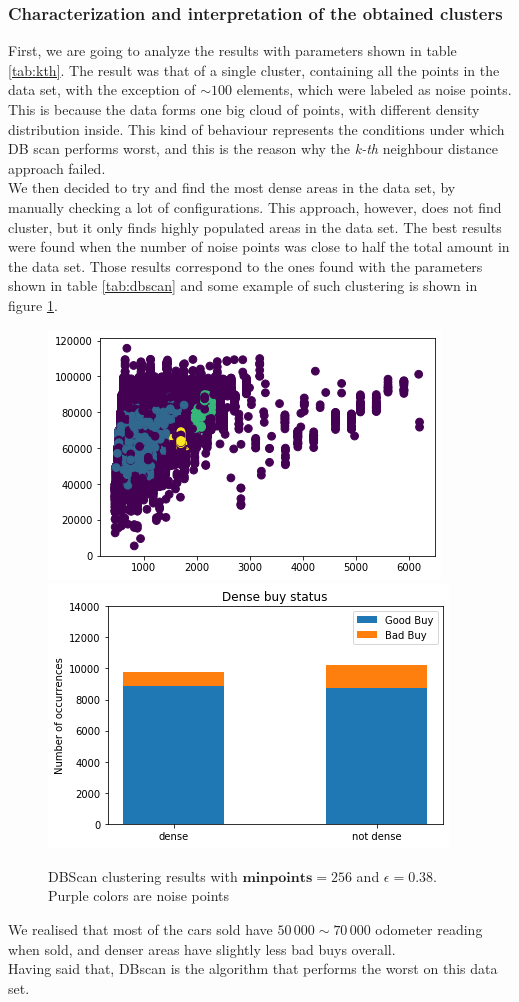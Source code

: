 \documentclass{article}
\begin{document}
	\subsubsection{Characterization and interpretation of the obtained clusters}
	\label{sec:dbscaneval}
	First, we are going to analyze the results with parameters shown in table \ref{tab:kth}. The result was that of a single cluster, containing all the points in the data set, with the exception of $\sim 100$ elements, which were labeled as noise points. This is because the data forms one big cloud of points, with different density distribution inside. This kind of behaviour represents the conditions under which DB scan performs worst, and this is the reason why the \emph{k-th} neighbour distance approach failed. \\
	We then decided to try and find the most dense areas in the data set, by manually checking a lot of configurations. This approach, however, does not find cluster, but it only finds highly populated areas in the data set. 
	The best results were found when the number of noise points was close to half the total amount in the data set. Those results correspond to the ones found with the parameters shown in table \ref{tab:dbscan} and some example of such clustering is shown in figure \ref{fig:dbscan}.
	
	\begin{figure}[H] 
		\centering
		\includegraphics[width=.35\textwidth]{cazzo}\hspace{1cm}
		\includegraphics[width=.36\textwidth]{bigboi}
		\caption{DBScan clustering results with $\mathbf{minpoints} = 256$ and $\epsilon = 0.38$. Purple colors are noise points}
		\label{fig:dbscan}
	\end{figure}
	
	We realised that most of the cars sold have $50\,000 \sim 70\,000$ odometer reading when sold, and denser areas have slightly less bad buys overall. \\
	Having said that, DBscan is the algorithm that performs the worst on this data set.
	
\end{document}
